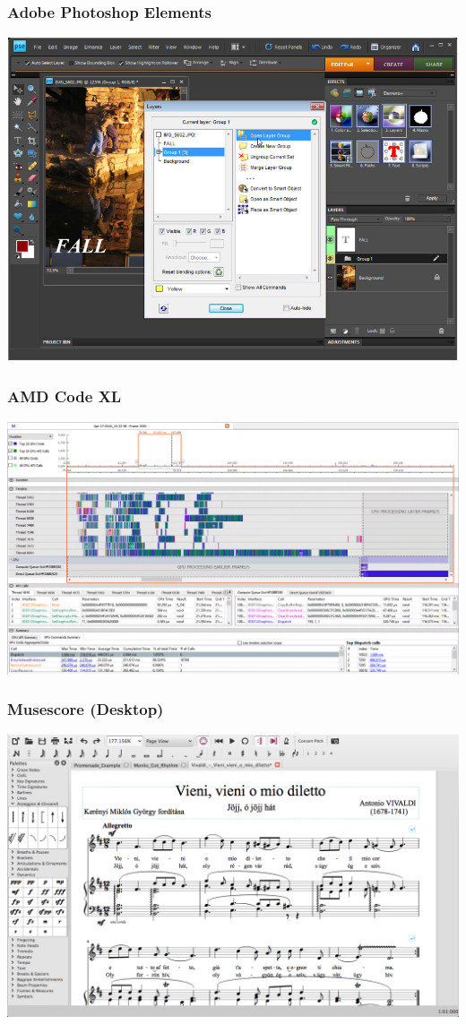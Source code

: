 \begin{frame}
  \frametitle{Adobe Photoshop Elements}
  \includegraphics[width=\textwidth]{apps_photoshop}
\end{frame}

\begin{frame}
  \frametitle{AMD Code XL}
  \includegraphics[width=\textwidth]{apps_codexl}
\end{frame}

\begin{frame}
  \frametitle{Musescore (Desktop)}
  \includegraphics[width=\textwidth]{apps_musescore}
\end{frame}

